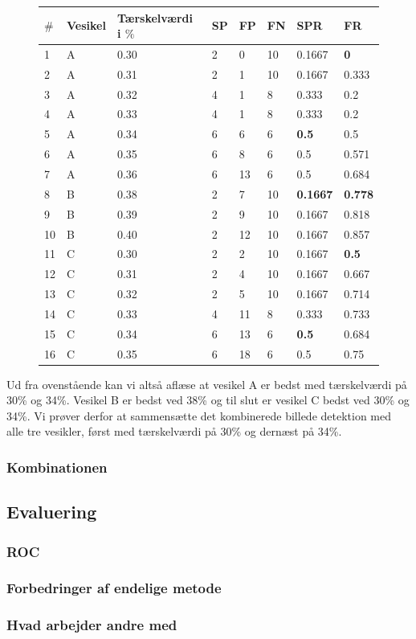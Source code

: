\begin{figure}[H]
	\centering
\begin{tabular}{l|l|l|l|l|l|l|l}
	$\#$ & Vesikel & Tærskelværdi i $\%$ & SP & FP & FN & SPR & FR \\\hline
	1	&	A	&	0.30	& 2		& 0		&10 &0.1667 &\textbf{0}\\\hline
	2	&	A	&	0.31	& 2		& 1		&10 &0.1667 &0.333\\\hline
	3	&	A	&	0.32	& 4		& 1		&8  &0.333 	&0.2\\\hline
	4	&	A	&	0.33	& 4		& 1		&8  &0.333 	&0.2\\\hline
	5	&	A	&	0.34	& 6		& 6		&6  &\textbf{0.5} 	&0.5\\\hline
	6	&	A	&	0.35	& 6		& 8		&6  &0.5 	&0.571\\\hline
	7	&	A	&	0.36	& 6		& 13	&6  &0.5	&0.684\\\hline
	8	&	B	&	0.38	& 2		& 7		&10 &\textbf{0.1667} &\textbf{0.778}\\\hline
	9	&	B	&	0.39	& 2		& 9		&10 &0.1667 &0.818\\\hline
	10	&	B	&	0.40	& 2		& 12	&10 &0.1667 &0.857\\\hline
	11	&	C	&	0.30	& 2		& 2		&10 &0.1667	&\textbf{0.5}\\\hline
	12	&	C	&	0.31	& 2		& 4		&10 &0.1667	&0.667\\\hline
	13	&	C	&	0.32	& 2		& 5		&10 &0.1667	&0.714\\\hline
	14	&	C	&	0.33	& 4		& 11	&8 	&0.333 	&0.733\\\hline
	15	&	C	&	0.34	& 6		& 13	&6 	&\textbf{0.5} 	&0.684\\\hline
	16	&	C	&	0.35	& 6		& 18	&6 	&0.5 	&0.75
\end{tabular} 
\end{figure}

Ud fra ovenstående kan vi altså aflæse at vesikel A er bedst med tærskelværdi på 30\% og 34\%. Vesikel B er bedst ved 38\% og til slut er vesikel C bedst ved 30\% og 34\%. Vi prøver derfor at sammensætte det kombinerede billede detektion med alle tre vesikler, først med tærskelværdi på 30\% og dernæst på 34\%. 




\subsubsection{Kombinationen} %
\subsection{Evaluering}
\subsubsection{ROC}
\subsubsection{Forbedringer af endelige metode}
\subsubsection{Hvad arbejder andre med} %
